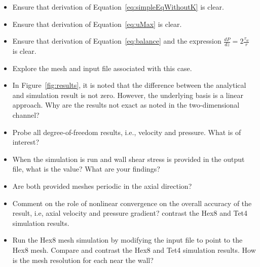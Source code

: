 \documentclass{article}
\begin{document}
\begin{itemize}
	\item Ensure that derivation of Equation~\ref{eq:simpleEqWithoutK} is clear.
	\item Ensure that derivation of Equation~\ref{eq:uMax} is clear.
	\item Ensure that derivation of Equation~\ref{eq:balance} and the expression
           $\frac{dP}{dz} = 2\frac{\tau_w}{r}$ is clear.
	\item Explore the mesh and input file associated with this case.
	\item In Figure~\ref{fig:results}, it is noted that the difference between
          the analytical and simulation result is not zero. However, the underlying
          basis is a linear approach. Why are the results not exact as noted in the two-dimensional
          channel?
        \item Probe all degree-of-freedom results, i.e., velocity and pressure. What is of interest?
        \item When the simulation is run and wall shear stress is provided in the output file,
          what is the value? What are your findings?
        \item Are both provided meshes periodic in the axial direction?
        \item Comment on the role of nonlinear convergence on the overall accuracy of the result, i.e,
          axial velocity and pressure gradient?
          contrast the Hex8 and Tet4 simulation results.
        \item Run the Hex8 mesh simulation by modifying the input file to point to the Hex8 mesh. Compare and
          contrast the Hex8 and Tet4 simulation results. How is the mesh resolution for each near the wall?
\end{itemize}
\end{document}

